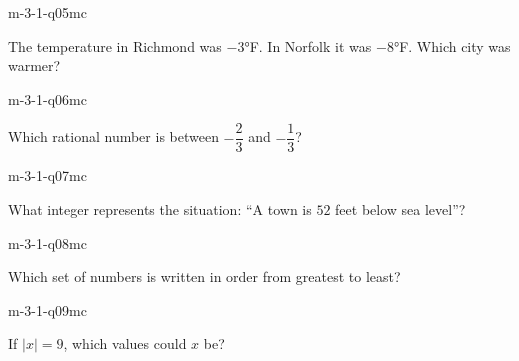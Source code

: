 \begin{practiceQuestion}{m-3-1-q05}{mc}
\begin{questionText}
The temperature in Richmond was $-3°$F. In Norfolk it was $-8°$F. Which city was warmer?
\end{questionText}
\end{practiceQuestion}

\begin{practiceQuestion}{m-3-1-q06}{mc}
\begin{questionText}
Which rational number is between $-\dfrac{2}{3}$ and $-\dfrac{1}{3}$?
\end{questionText}
\end{practiceQuestion}

\begin{practiceQuestion}{m-3-1-q07}{mc}
\begin{questionText}
What integer represents the situation: ``A town is $52$ feet below sea level''?
\end{questionText}
\end{practiceQuestion}

\begin{practiceQuestion}{m-3-1-q08}{mc}
\begin{questionText}
Which set of numbers is written in order from greatest to least?
\end{questionText}
\end{practiceQuestion}

\begin{practiceQuestion}{m-3-1-q09}{mc}
\begin{questionText}
If $|x| = 9$, which values could $x$ be?
\end{questionText}
\end{practiceQuestion}

